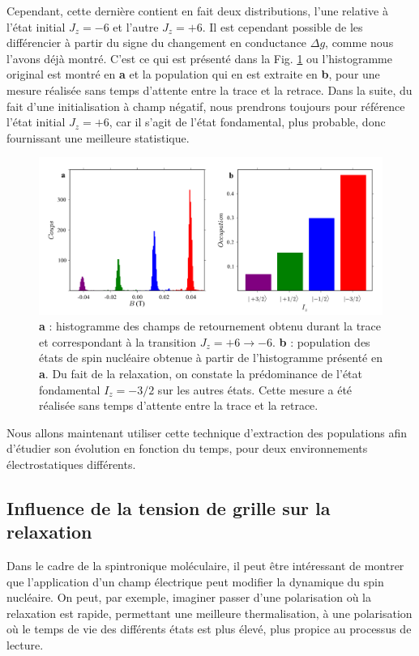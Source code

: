 Cependant, cette dernière contient en fait deux distributions, l'une relative à l'état initial $J_z=-6$ et l'autre $J_z=+6$. Il est cependant possible de les différencier à partir du signe du changement en conductance $\Delta g$, comme nous l'avons déjà montré. C'est ce qui est présenté dans la Fig. \ref{extract_pop} ou l'histogramme original est montré en \textbf{a} et la population qui en est extraite en \textbf{b}, pour une mesure réalisée sans temps d'attente entre la trace et la retrace. Dans la suite, du fait d'une initialisation à champ négatif, nous prendrons toujours pour référence l'état initial $J_z=+6$, car il s'agit de l'état fondamental, plus probable, donc fournissant une meilleure statistique.

\begin{figure}
\includegraphics[scale=0.45]{Resultats/PopState/PopState.pdf} 
\caption{\textbf{a} : histogramme des champs de retournement obtenu durant la trace et correspondant à la transition $J_z = +6 \rightarrow -6$. \textbf{b} : population des états de spin nucléaire obtenue à partir de l'histogramme présenté en \textbf{a}. Du fait de la relaxation, on constate la prédominance de l'état fondamental $I_z=-3/2$ sur les autres états. Cette mesure a été réalisée sans temps d'attente entre la trace et la retrace.}
\label{extract_pop}
\end{figure}

Nous allons maintenant utiliser cette technique d'extraction des populations afin d'étudier son évolution en fonction du temps, pour deux environnements électrostatiques différents.

\subsection{Influence de la tension de grille sur la relaxation}
Dans le cadre de la spintronique moléculaire, il peut \^etre intéressant de montrer que l'application d'un champ électrique peut modifier la dynamique du spin nucléaire. On peut, par exemple, imaginer passer d'une polarisation où la relaxation est rapide, permettant une meilleure thermalisation, à une polarisation où le temps de vie des différents états est plus élevé, plus propice au processus de lecture.

